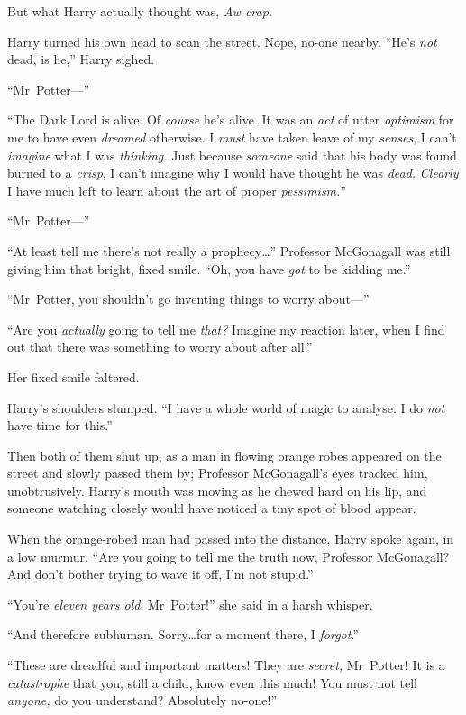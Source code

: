 But what Harry actually thought was, \emph{Aw crap.}

Harry turned his own head to scan the street. Nope, no-one nearby. “He’s \emph{not} dead, is he,” Harry sighed.

“Mr~Potter—”

“The Dark Lord is alive. Of \emph{course} he’s alive. It was an \emph{act} of utter \emph{optimism} for me to have even \emph{dreamed} otherwise. I \emph{must} have taken leave of my \emph{senses}, I can’t \emph{imagine} what I was \emph{thinking.} Just because \emph{someone} said that his body was found burned to a \emph{crisp}, I can’t imagine why I would have thought he was \emph{dead.} \emph{Clearly} I have much left to learn about the art of proper \emph{pessimism.}”

“Mr~Potter—”

“At least tell me there’s not really a prophecy…” Professor McGonagall was still giving him that bright, fixed smile. “Oh, you have \emph{got} to be kidding me.”

“Mr~Potter, you shouldn’t go inventing things to worry about—”

“Are you \emph{actually} going to tell me \emph{that?} Imagine my reaction later, when I find out that there was something to worry about after all.”

Her fixed smile faltered.

Harry’s shoulders slumped. “I have a whole world of magic to analyse. I do \emph{not} have time for this.”

Then both of them shut up, as a man in flowing orange robes appeared on the street and slowly passed them by; Professor McGonagall’s eyes tracked him, unobtrusively. Harry’s mouth was moving as he chewed hard on his lip, and someone watching closely would have noticed a tiny spot of blood appear.

When the orange-robed man had passed into the distance, Harry spoke again, in a low murmur. “Are you going to tell me the truth now, Professor McGonagall? And don’t bother trying to wave it off, I’m not stupid.”

“You’re \emph{eleven years old}, Mr~Potter!” she said in a harsh whisper.

“And therefore subhuman. Sorry…for a moment there, I \emph{forgot}.”

“These are dreadful and important matters! They are \emph{secret,} Mr~Potter! It is a \emph{catastrophe} that you, still a child, know even this much! You must not tell \emph{anyone,} do you understand? Absolutely no-one!”

